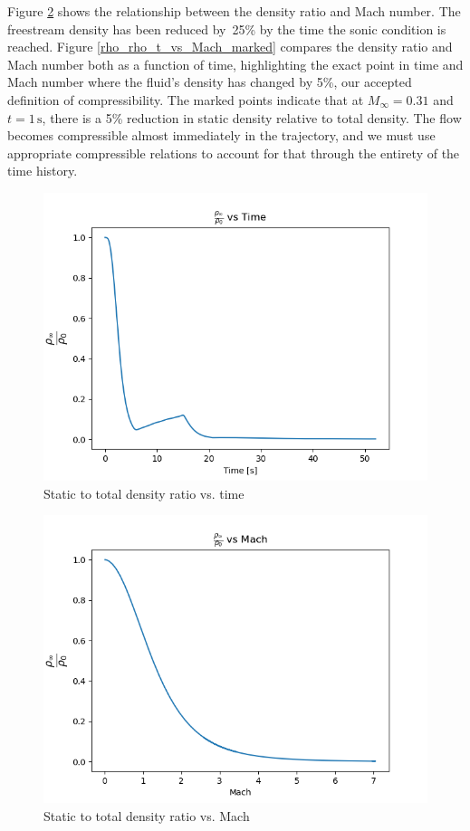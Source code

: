 \documentclass[../main.tex]{subfiles}
\begin{document}
Figure \ref{rho_rho_t_vs_Mach} shows the relationship between the density ratio and Mach number.
The freestream density has been reduced by~25\% by the time the sonic condition is reached.
Figure \ref{rho_rho_t_vs_Mach_marked} compares the density ratio and Mach number both as a function of time, highlighting the exact point in time and Mach number where the fluid's density has changed by 5\%, our accepted definition of compressibility.
The marked points indicate that at \(M_\infty = 0.31\) and \(t=1 \, \unit{\s}\), there is a 5\% reduction in static density relative to total density.
The flow becomes compressible almost immediately in the trajectory, and we must use appropriate compressible relations to account for that through the entirety of the time history.

\begin{figure}[h!]
    \centering
    \includegraphics[scale=.7]{../../images/problem_1/rho_rho_t_vs_Time.png}
    \caption{Static to total density ratio vs. time}
    \label{rho_rho_t_time}
\end{figure}

\begin{figure}[h!]
    \centering
    \includegraphics[scale=.7]{../../images/problem_1/rho_rho_t_vs_Mach.png}
    \caption{Static to total density ratio vs. Mach}
    \label{rho_rho_t_vs_Mach}
\end{figure}
\end{document}
